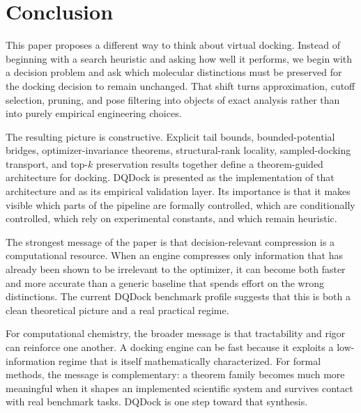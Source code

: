 \section{Conclusion}\label{sec:conclusion}

This paper proposes a different way to think about virtual docking. Instead of beginning with a search heuristic and asking how well it performs, we begin with a decision problem and ask which molecular distinctions must be preserved for the docking decision to remain unchanged. That shift turns approximation, cutoff selection, pruning, and pose filtering into objects of exact analysis rather than into purely empirical engineering choices.

The resulting picture is constructive. Explicit tail bounds, bounded-potential bridges, optimizer-invariance theorems, structural-rank locality, sampled-docking transport, and top-$k$ preservation results together define a theorem-guided architecture for docking. DQDock is presented as the implementation of that architecture and as its empirical validation layer. Its importance is that it makes visible which parts of the pipeline are formally controlled, which are conditionally controlled, which rely on experimental constants, and which remain heuristic.

The strongest message of the paper is that decision-relevant compression is a computational resource. When an engine compresses only information that has already been shown to be irrelevant to the optimizer, it can become both faster and more accurate than a generic baseline that spends effort on the wrong distinctions. The current DQDock benchmark profile suggests that this is both a clean theoretical picture and a real practical regime.

For computational chemistry, the broader message is that tractability and rigor can reinforce one another. A docking engine can be fast because it exploits a low-information regime that is itself mathematically characterized. For formal methods, the message is complementary: a theorem family becomes much more meaningful when it shapes an implemented scientific system and survives contact with real benchmark tasks. DQDock is one step toward that synthesis.

